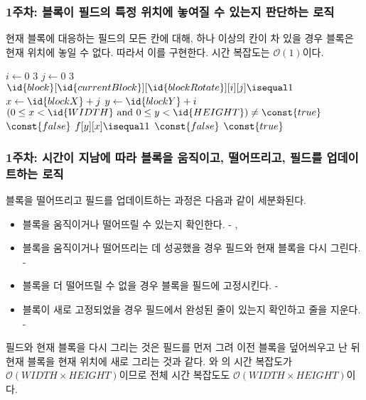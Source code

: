 \subsubsection{1주차: 블록이 필드의 특정 위치에 놓여질 수 있는지 판단하는 로직} 현재 블록에 대응하는 필드의 모든 칸에 대해,
하나 이상의 칸이 차 있을 경우 블록은 현재 위치에 놓일 수 없다. 따라서 이를 구현한다. 시간 복잡도는 $\mathcal{O}\left(1\right)$이다.
\begin{codebox}
\li \For $i \gets 0$ \To $3$
\li \Do
        \For $j \gets 0$ \To $3$
\li     \Do
            \If $\id{block}[\id{currentBlock}][\id{blockRotate}][i][j] \isequal 1$
\li         \Then
                $x \gets \id{blockX} + j$
\li             $y \gets \id{blockY} + i$
\li             \If $\left( 0 \leq x < \id{WIDTH} \mbox{ and } 0 \leq y < \id{HEIGHT} \right) \neq \const{true}$
\li                 \Then \Return $\const{false}$
                \End
\li             \If $f[y][x] \isequal 1$
\li                 \Then \Return $\const{false}$
                \End
            \End
        \End
    \End
\li \Return $\const{true}$
\end{codebox}

\subsubsection{1주차: 시간이 지남에 따라 블록을 움직이고, 떨어뜨리고, 필드를 업데이트하는 로직} 블록을 떨어뜨리고 필드를 업데이트하는 과정은 다음과 같이 세분화된다.
\begin{itemize}
    \item 블록을 움직이거나 떨어뜨릴 수 있는지 확인한다. - , 
    \item 블록을 움직이거나 떨어뜨리는 데 성공했을 경우 필드와 현재 블록을 다시 그린다. - 
    \item 블록을 더 떨어뜨릴 수 없을 경우 블록을 필드에 고정시킨다. - 
    \item 블록이 새로 고정되었을 경우 필드에서 완성된 줄이 있는지 확인하고 줄을 지운다. - 
\end{itemize}

필드와 현재 블록을 다시 그리는 것은 필드를 먼저 그려 이전 블록을 덮어씌우고 난 뒤 현재 블록을 현재 위치에 새로 그리는 것과 같다.
와 의 시간 복잡도가 $\mathcal{O}\left(WIDTH\times HEIGHT\right)$이므로 전체
시간 복잡도도 $\mathcal{O}\left(WIDTH\times HEIGHT\right)$이다.

